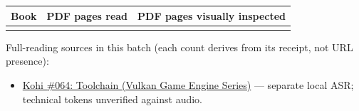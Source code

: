 {\def\LTcaptype{none} %
\begin{longtable}[]{@{}lll@{}}
\toprule\noalign{}
Book & PDF pages read & PDF pages visually inspected \\
\midrule\noalign{}
\endhead
\bottomrule\noalign{}
\endlastfoot
\end{longtable}
}

Full-reading sources in this batch (each count derives from its receipt, not URL presence):

\begin{itemize}
\tightlist
\item
  \href{https://www.youtube.com/watch?v=cCEmwjfHIkY}{Kohi \#064: Toolchain (Vulkan Game Engine Series)} --- separate local ASR; technical tokens unverified against audio.
\end{itemize}
